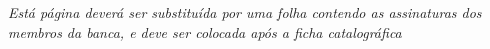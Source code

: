 \null
\vfill

\begin{center}
	\textit{Está página deverá ser substituída por uma folha contendo as assinaturas dos membros da banca, e deve ser colocada após a ficha catalográfica}
\end{center}
